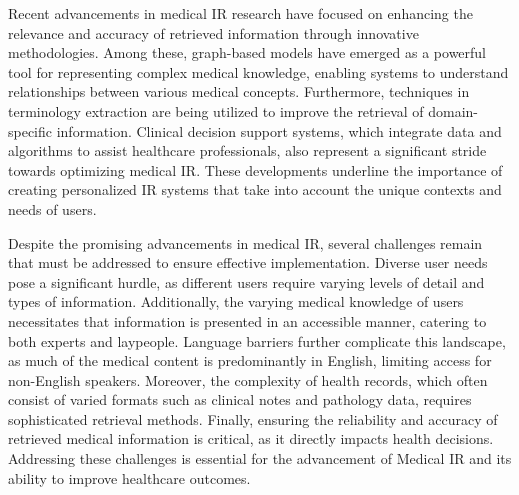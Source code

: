 \documentclass[conference]{IEEEtran}
\begin{document}
Recent advancements in medical IR research have focused on enhancing the relevance and accuracy of retrieved information through innovative methodologies. Among these, graph-based models have emerged as a powerful tool for representing complex medical knowledge, enabling systems to understand relationships between various medical concepts. Furthermore, techniques in terminology extraction are being utilized to improve the retrieval of domain-specific information. Clinical decision support systems, which integrate data and algorithms to assist healthcare professionals, also represent a significant stride towards optimizing medical IR. These developments underline the importance of creating personalized IR systems that take into account the unique contexts and needs of users.

Despite the promising advancements in medical IR, several challenges remain that must be addressed to ensure effective implementation. Diverse user needs pose a significant hurdle, as different users require varying levels of detail and types of information. Additionally, the varying medical knowledge of users necessitates that information is presented in an accessible manner, catering to both experts and laypeople. Language barriers further complicate this landscape, as much of the medical content is predominantly in English, limiting access for non-English speakers. Moreover, the complexity of health records, which often consist of varied formats such as clinical notes and pathology data, requires sophisticated retrieval methods. Finally, ensuring the reliability and accuracy of retrieved medical information is critical, as it directly impacts health decisions. Addressing these challenges is essential for the advancement of Medical IR and its ability to improve healthcare outcomes.



\end{document}
